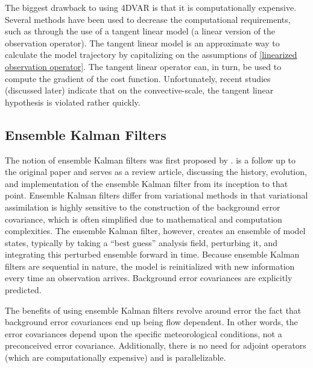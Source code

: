 The biggest drawback to using 4DVAR is that it is computationally expensive. Several methods have been used to decrease the computational requirements, such as through the use of a tangent linear model (a linear version of the observation operator). The tangent linear model is an approximate way to calculate the model trajectory by capitalizing on the assumptions of \ref{linearized observation operator}. The tangent linear operator can, in turn, be used to compute the gradient of the cost function. Unfortunately, recent studies (discussed later) indicate that on the convective-scale, the tangent linear hypothesis is violated rather quickly.




\subsection{Ensemble Kalman Filters}

The notion of ensemble Kalman filters was first proposed by \cite{evensen1994enkf}. \cite{evensen2003enkf} is a follow up to the original paper and serves as a review article, discussing the history, evolution, and implementation of the ensemble Kalman filter from its inception to that point. Ensemble Kalman filters differ from variational methods in that variational assimilation is highly sensitive to the construction of the background error covariance, which is often simplified due to mathematical and computation complexities. The ensemble Kalman filter, however, creates an ensemble of model states, typically by taking a ``best guess'' analysis field, perturbing it, and integrating this perturbed ensemble forward in time. Because ensemble Kalman filters are sequential in nature, the model is reinitialized with new information every time an observation arrives. Background error covariances are explicitly predicted.


The benefits of using ensemble Kalman filters revolve around error the fact that background error covariances end up being flow dependent. In other words, the error covariances depend upon the specific meteorological conditions, not a preconceived error covariance.  Additionally, there is no need for adjoint operators (which are computationally expensive) and is parallelizable.



